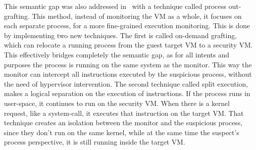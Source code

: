 \par This semantic gap was also addressed in~\cite{srinivasan2011process} with a technique called process out-grafting. This method, instead of monitoring the \ac{VM} as a whole, it focuses on each separate process, for a more fine-grained execution monitoring. This is done by implementing two new techniques. The first is called on-demand grafting, which can relocate a running process from the guest target \ac{VM} to a security \ac{VM}. This effectively bridges completely the semantic gap, as for all intents and purposes the process is running on the same system as the monitor. This way the monitor can intercept all instructions executed by the suspicious process, without the need of hypervisor intervention. The second technique called split execution, makes a logical separation on the execution of instructions. If the process runs in user-space, it continues to run on the security \ac{VM}. When there is a kernel request, like a system-call, it executes that instruction on the target \ac{VM}. That technique creates an isolation between the monitor and the suspicious process, since they don’t run on the same kernel, while at the same time the suspect’s process perspective, it is still running inside the target \ac{VM}. 

